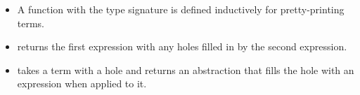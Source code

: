 \begin{itemize}

\item A function  with the type signature  is defined inductively for pretty-printing terms.

\item {} returns the first expression with any holes filled in by the second expression.
  
  \begin{comment}
  ret d e = case d of
    Hole -> e
    App m n -> App (ret m e) (ret n e)
    Val (Abs x m) -> Val $ Abs x (ret m e)
    PushPrompt m n -> PushPrompt (ret m e) (ret n e)
    WithSubCont m n -> WithSubCont (ret m e) (ret n e)
    PushSubCont m n -> PushSubCont (ret m e) (ret n e)
    otherwise -> d
  \end{comment}

  \begin{Shaded}
  \begin{Highlighting}[]
  \FunctionTok{=}  
     \OtherTok{->} 
     \OtherTok{->}  
     \NormalTok{(} \OtherTok{->}  \FunctionTok{$}  
     \OtherTok{->}  
     \OtherTok{->}  
     \OtherTok{->}  
    \OtherTok{->} 
  \end{Highlighting}
  \end{Shaded}

\item {} takes a term with a hole and returns an abstraction that fills the hole with an expression when applied to it.
  \begin{comment}
    contextToAbs e = (Val (Abs fresh body))
      where fresh = 'x'  -- TODO: generate truly fresh var
            body = ret e (Val (Var fresh))
  \end{comment}
  \begin{Shaded}
  \begin{Highlighting}[]
  \FunctionTok{=} \NormalTok{(} \NormalTok{(} 
     \FunctionTok{=}   
          \FunctionTok{=}  \NormalTok{(} 
  \end{Highlighting}
  \end{Shaded}


\end{itemize}
